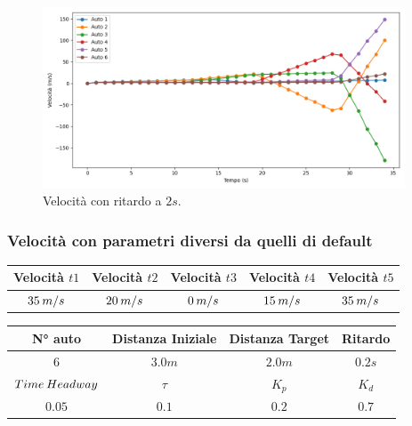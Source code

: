 \begin{figure}[H]
    \includegraphics[width=0.96\textwidth]{images/5-experiment/delay/velocity_2+.png}
    \caption{Velocità con ritardo a $2 s$.}
    \label{fig:2-delay-velocity}
\end{figure}
\vspace*{\fill}
\newpage


\subsubsection{Velocità con parametri diversi da quelli di default}

\begin{table}[h]
    \centering
    \begin{tabular}{|c|c|c|c|c|}
        \hline
        Velocità $t1$ & Velocità $t2$ & Velocità $t3$ &Velocità $t4$ &Velocità $t5$\\
        \hline
            $35\hspace{0.2em}m/s$ & $20\hspace{0.2em}m/s$ & $0\hspace{0.2em}m/s$ & $15\hspace{0.2em}m/s$ & $35\hspace{0.2em}m/s$ \\
        \hline
    \end{tabular}
\end{table}

\begin{table}[h]
    \centering
    \begin{tabular}{|c|c|c|c|}
        \hline
        N° auto & Distanza Iniziale & Distanza Target & Ritardo \\
        \hline
        $6$ & $3.0 m$ & $2.0 m$ & $0.2 s$ \\
        \hline
        $Time\hspace{0.2em}Headway$ & $\tau$ & $K_p$ & $K_d$  \\
        \hline
        $0.05$ & $0.1$ & $0.2$ & $0.7$ \\
        \hline
    \end{tabular}
\end{table}

